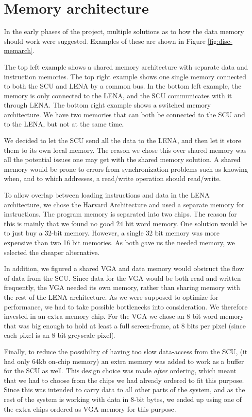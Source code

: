\section {Memory architecture}

In the early phases of the project,
multiple solutions as to how the data memory should work were suggested. Examples of these are shown in Figure \ref{fig:disc-memarch}.

The top left example shows a shared memory architecture with separate data and instruction memories. The top right example shows one single memory connected to both the SCU and LENA by a common bus. In the bottom left example, the memory is only connected to the LENA, and the SCU communicates with it through LENA. The bottom right example shows a switched memory architecture. We have two memories that can both be connected to the SCU and to the LENA, but not at the same time.

We
decided to let the \ac{SCU} send all the data to the \ac{LENA}, and then let it store
them to its own local memory. The reason we chose this over shared memory was
all the potential issues one may get with the shared memory solution. A shared memory
would be prone to errors from synchronization problems such as knowing when,
and to which addresses, a read/write operation should read/write.

To allow overlap between loading instructions and data in the LENA
architecture, we chose the Harvard Architecture and used a separate memory for
instructions. The program memory is
separated into two chips. The reason for this is mainly that we found no good 24
bit word memory. One solution would be to just buy a 32-bit memory. However, a single 32
bit memory was more expensive than two 16 bit memories. As both gave us the needed memory,
we selected the cheaper alternative.

In addition, we figured a shared \ac{VGA} and data memory would obstruct the flow
of data from the \ac{SCU}. Since data for the \ac{VGA} would be both read and written
frequently, the \ac{VGA} needed its own memory, rather than sharing memory with
the rest of the LENA architecture. As we were supposed to optimize for performance, we had to take
possible bottlenecks into consideration. We therefore invested in an extra
memory chip. For the VGA we chose an 8-bit word memory that was big enough to
hold at least a full screen-frame, at 8 bits per pixel (since each pixel is an 8-bit greyscale pixel).

Finally, to reduce the possibility of having too slow data-access from the SCU, (it had only 64kb on-chip memory) 
an extra memory was added to work as a buffer for the SCU as well. This design choice was made {\em after} ordering, 
which meant that we had to choose from the chips we had already ordered to fit this purpose. Since this was intended 
to carry data to all other parts of the system, and as the rest of the system is working with data in 8-bit bytes, 
we ended up using one of the extra chips ordered as \ac{VGA} memory for this purpose.

